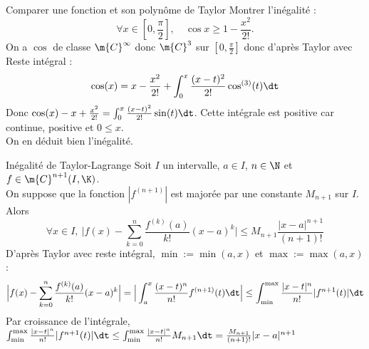\documentclass[11pt]{article}
\begin{document}
\begin{ex}{Comparer une fonction et son polynôme de Taylor}{}
    Montrer l'inégalité :
    \begin{equation*}
        \forall x \in \left[ 0,\frac{\pi}{2} \right], \quad \cos x \geq 1 - \frac{x^2}{2!}.
    \end{equation*}
    \tcblower
    On a $\cos$ de classe $\m{C}^{\infty}$ donc $\m{C}^3$ sur $[0, \frac{\pi}{2}]$ donc d'après Taylor avec Reste intégral :
    \begin{equation*}
        \cos(x) = x - \frac{x^2}{2!} + \int_0^x\frac{(x-t)^2}{2!}\cos^{(3)}(t)\dt
    \end{equation*}
    Donc $\cos(x) - x + \frac{x^2}{2!} = \int_0^x\frac{(x-t)^2}{2!}\sin(t)\dt$. Cette intégrale est positive car continue, positive et $0\leq x$.\\
    On en déduit bien l'inégalité.
\end{ex}

\begin{prop}{Inégalité de Taylor-Lagrange}{}
    Soit $I$ un intervalle, $a\in I$, $n\in \N$ et $f\in\m{C}^{n+1}(I,\K)$.\\
    On suppose que la fonction $|f^{(n+1)}|$ est majorée par une constante $M_{n+1}$ sur $I$. Alors
    \begin{equation*}
        \forall x \in I, ~ \Big|f(x)-\sum_{k=0}^n\frac{f^{(k)}(a)}{k!}(x-a)^k\Big|\leq M_{n+1}\frac{|x-a|^{n+1}}{(n+1)!}
    \end{equation*}
    \tcblower
    D'après Taylor avec reste intégral, $\min:=\min(a,x)$ et $\max:=\max(a,x)$ :
    \begin{equation*}
        \Big|f(x)-\sum_{k=0}^n\frac{f^{(k)}(a)}{k!}(x-a)^k\Big|=\Big|\int_a^x\frac{(x-t)^n}{n!}f^{(n+1)}(t)\dt\Big|\leq\int_{\min}^{\max}\frac{|x-t|^n}{n!}|f^{n+1}(t)|\dt
    \end{equation*}
    Par croissance de l'intégrale, $\int_{\min}^{\max}\frac{|x-t|^n}{n!}|f^{n+1}(t)|\dt\leq\int_{\min}^{\max}\frac{|x-t|^n}{n!}M_{n+1}\dt=\frac{M_{n+1}}{(n+1)!}|x-a|^{n+1}$
\end{prop}
\end{document}
